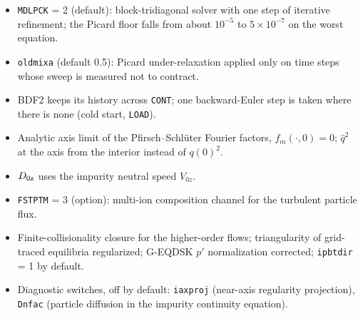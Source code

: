 \documentclass[11pt]{article}
\def\r#1{{\rm#1}}
\begin{document}
\begin{itemize}
\item \texttt{MDLPCK} = 2 (default): block-tridiagonal solver with one step of
  iterative refinement; the Picard floor falls from about $10^{-5}$ to
  $5\times10^{-7}$ on the worst equation.
\item \texttt{oldmixa} (default 0.5): Picard under-relaxation applied only on
  time steps whose sweep is measured not to contract.
\item BDF2 keeps its history across \texttt{CONT}; one backward-Euler step is
  taken where there is none (cold start, \texttt{LOAD}).
\item Analytic axis limit of the Pfirsch--Schl\"uter Fourier factors,
  $f_m(\cdot,0) = 0$; $\hat q^2$ at the axis from the interior instead of $q(0)^2$.
\item $D_{0\r{z}}$ uses the impurity neutral speed $V_{0z}$.
\item \texttt{FSTPTM} = 3 (option): multi-ion composition channel for the
  turbulent particle flux.
\item Finite-collisionality closure for the higher-order flows; triangularity of
  grid-traced equilibria regularized; G-EQDSK $p'$ normalization corrected;
  \texttt{ipbtdir} = 1 by default.
\item Diagnostic switches, off by default: \texttt{iaxproj} (near-axis
  regularity projection), \texttt{Dnfac} (particle diffusion in the impurity
  continuity equation).
\end{itemize}
\end{document}
